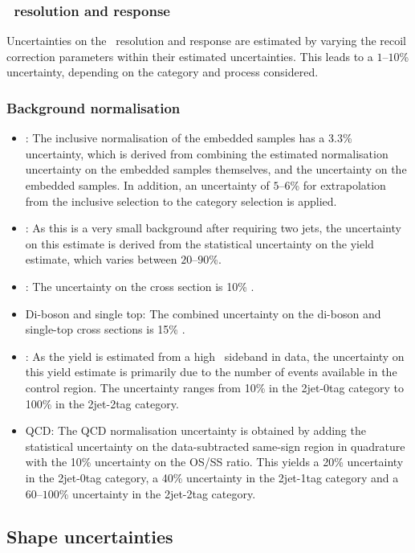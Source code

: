 \subsubsection*{\MET~resolution and response}
Uncertainties on the \MET~resolution and response are estimated by varying
the recoil correction parameters within their estimated uncertainties. This 
leads to a $1$--$10$\% uncertainty, depending on the category and process considered.
\subsubsection*{Background normalisation}
\begin{itemize}
\item \Ztautau : The inclusive normalisation of the embedded samples has a 3.3\% uncertainty, which is derived
from combining the estimated normalisation uncertainty on the embedded samples themselves, and the uncertainty on the \ttbar embedded samples. In addition, an uncertainty of $5$--$6$\% for extrapolation from the inclusive selection to the category selection is applied.
\item \Zellell: As this is a very small background after requiring two jets, the uncertainty on this estimate is derived from the statistical uncertainty on the yield estimate, which varies between $20$--$90$\%.
\item \ttbar: The uncertainty on the \ttbar cross section is 10\% \cite{SMHtautauCMS}.
\item Di-boson and single top: The combined uncertainty on the di-boson and single-top cross sections is 15\% \cite{SMHtautauCMS}.
\item \Wjets: As the \Wjets yield is estimated from a high \mT~sideband in data, the uncertainty on this yield estimate is primarily due to the number of events available in the control region. The uncertainty ranges from 10\% in the 2jet-0tag category to 100\% in the 2jet-2tag category.
\item QCD: The QCD normalisation uncertainty is obtained by adding the statistical uncertainty on the data-subtracted same-sign region in quadrature with the 10\% uncertainty on the OS/SS ratio. This yields a 20\% uncertainty in the 2jet-0tag category, a 40\% uncertainty in the 2jet-1tag category and a $60$--$100$\% uncertainty in the 2jet-2tag category.
\end{itemize}
\subsection{Shape uncertainties}
\label{sec:hhh_uncerts_shape}
